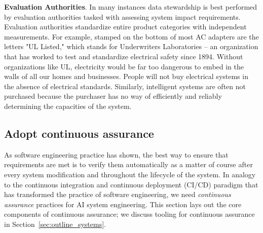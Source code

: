 \textbf{Evaluation Authorities}. In many instances data stewardship is best performed by evaluation authorities tasked with assessing system impact requirements. Evaluation authorities standardize entire product categories with independent measurements. For example, stamped on the bottom of most AC adapters are the letters "UL Listed," which stands for Underwriters Laboratories -- an organization that has worked to test and standardize electrical safety since 1894. Without organizations like UL, electricity would be far too dangerous to embed in the walls of all our homes and businesses. People will not buy electrical systems in the absence of electrical standards. Similarly, intelligent systems are often not purchased because the purchaser has no way of efficiently and reliably determining the capacities of the system.


\subsection{Adopt continuous assurance}

As software engineering practice has shown, the best way to ensure that requirements are met is to verify them automatically as a matter of course after every system modification and throughout the lifecycle of the system. In analogy to the continuous integration and continuous deployment (CI/CD) paradigm that has transformed the practice of software engineering, we need \emph{continuous assurance} practices for AI system engineering. This section lays out the core components of continuous assurance; we discuss tooling for continuous assurance in Section~\ref{sec:outline_systems}.

